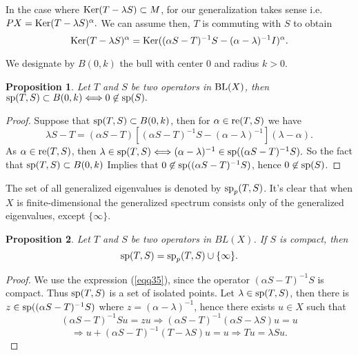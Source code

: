 \documentclass[
11pt,%
tightenlines,%
twoside,%
onecolumn,%
nofloats,%
nobibnotes,%
nofootinbib,%
superscriptaddress,%
noshowpacs,%
centertags]%
{revtex4}
\newtheorem{proposition}{Proposition}[section]
\def\Ker{\mathop{\rm Ker}\nolimits}
\def\re{\mathop{\rm re}\nolimits}
\def\BL{\mathop{\rm BL}\nolimits}
\def\sp{\mathop{\rm sp}\nolimits}
\def\re{\mathop{\rm re}\nolimits}
\begin{document}
In the case where $\Ker(T-\lambda S)\subset M$, for our
generalization takes sense i.e. $PX=\Ker(T-\lambda S)^{\alpha}.$ We
can assume then, $T$ is commuting with $S$ to obtain
$$\Ker(T-\lambda S)^{\alpha}=\Ker((\alpha S-T)^{-1}S-(\alpha-\lambda)^{-1}I)^{\alpha}.$$\par
We designate by $B(0, k)$ the bull with center $0$ and radius $k >
0$.
\begin{proposition}Let $T$ and $S$  be two operators in $\BL(X)$, then
$
    \sp(T,S)\subset B(0,k)\Longleftrightarrow0\not\in \sp(S).
$
\end{proposition}
\begin{proof} Suppose that $\sp(T,S)\subset B(0,k)$, then for $\alpha\in \re(T,S)$ we have
\begin{equation}\label{eqq35}
    \lambda S- T=(\alpha S-T)[(\alpha S-T)^{-1}S-(\alpha-\lambda)^{-1}](\lambda-\alpha).
\end{equation}
As $\alpha\in \re(T,S)$, then
$
    \lambda\in \sp(T,S)\Longleftrightarrow (\alpha-\lambda)^{-1}\in \sp((\alpha S-T)^{-1}S).
$
So the fact that $\sp(T,S)\subset B(0,k)$ Implies that $0\not\in  \sp((\alpha S-T)^{-1}S)$, hence $0\not\in \sp(S)$.
\end{proof}
The set of all generalized eigenvalues is denoted  by
$\sp_{p}(T,S)$. It's clear that when $X$ is finite-dimensional the
generalized spectrum consists only of the generalized eigenvalues,
except $\{\infty\}$.
\begin{proposition}
Let $T$ and $S$ be two operators in $BL(X)$. If $S$ is compact, then
\begin{equation*}
    \sp(T,S)=\sp_{p}(T,S)\cup\{\infty\}.
\end{equation*}
\end{proposition}
\begin{proof} We use  the expression (\ref{eqq35}),
 since the operator \hbox{$(\alpha S-T)^{-1}S$} is compact.
 Thus $\sp(T,S)$ is a set of isolated points. Let $\lambda\in \sp(T,S)$,
 then there is $z\in \sp((\alpha S-T)^{-1}S)$ where $z=(\alpha-\lambda)^{-1}$, hence there exists $u\in X$ such that
$$
    (\alpha S-T)^{-1}Su=zu \Longrightarrow (\alpha S-T)^{-1}(\alpha S-\lambda S)u=u
    $$
    $$
    \Longrightarrow u+(\alpha S-T)^{-1}(T-\lambda S)u=u    \Longrightarrow Tu=\lambda Su.
$$
\end{proof}
\end{document}
